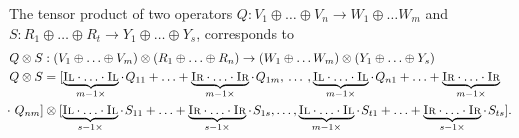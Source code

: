  
The tensor product of two operators $Q: V_1 \oplus \ldots \oplus V_n \rightarrow W_1  \oplus \ldots W_m $ and $S: R_1 \oplus \ldots \oplus R_t \rightarrow Y_1 \oplus \ldots \oplus Y_s$, corresponds to 
\begin{equation}
  \begin{split}
    &Q \otimes S:  (V_1 \oplus \ldots \oplus V_m) \otimes  (R_1 \oplus \ldots \oplus R_n)  \rightarrow  (W_1  \oplus \ldots W_m) \otimes  (Y_1 \oplus \ldots \oplus Y_s)\\
    & Q \otimes S = [ \underbrace{\textsc{Il} \cdot \ldots \cdot \textsc{Il}}_{m-1 \times} \cdot \hspace{1pt} Q_{11} + \ldots +   \underbrace{\textsc{Ir} \cdot \ldots \cdot \textsc{Ir}}_{m-1 \times}\cdot \hspace{1pt} Q_{1m},  \hspace{2pt} \ldots  \hspace{2pt},  \underbrace{\textsc{Il} \cdot \ldots \cdot \textsc{Il}}_{m-1 \times} \cdot\hspace{1pt} Q_{n1} + \ldots + \underbrace{\textsc{Ir} \cdot \ldots \cdot \textsc{Ir}}_{m-1 \times}  \\ 
    & \hspace{-4pt} \cdot \hspace{1pt} Q_{nm}] \otimes [ \underbrace{\textsc{Il} \cdot \ldots \cdot \textsc{Il}}_{s-1 \times} \cdot \hspace{1pt} S_{11} + \ldots +  \underbrace{\textsc{Ir} \cdot \ldots \cdot \textsc{Ir}}_{s-1 \times} \cdot \hspace{1pt} S_{1s}, \ldots,  \underbrace{\textsc{Il} \cdot \ldots \cdot \textsc{Il}}_{m-1 \times} \cdot \hspace{1pt} S_{t1} + \ldots +  \underbrace{\textsc{Ir} \cdot \ldots \cdot \textsc{Ir}}_{s-1 \times} \cdot \hspace{1pt} S_{ts}]. \\
  \end{split}
\end{equation}


